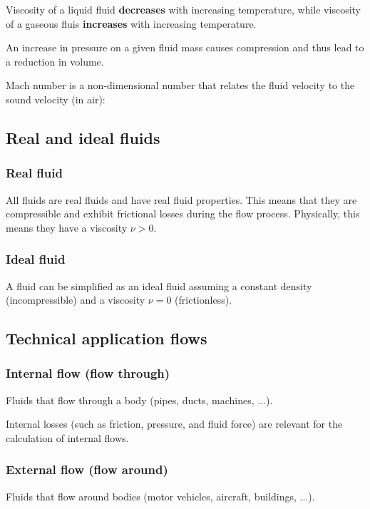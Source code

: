 \documentclass{article}
\begin{document}
Viscosity of a liquid fluid \textbf{decreases} with increasing temperature,
while viscosity of a gaseous fluis \textbf{increases} with increasing temperature.


An increase in pressure on a given fluid mass causes compression and thus
lead to a reduction in volume.

Mach number is a non-dimensional number that relates the fluid velocity
to the sound velocity (in air):


\subsection{Real and ideal fluids}
\subsubsection{Real fluid}
All fluids are real fluids and have real fluid properties. This means
that they are compressible and exhibit frictional losses during the flow process.
Physically, this means they have a viscosity $\nu > 0$.

\subsubsection{Ideal fluid}
A fluid can be simplified as an ideal fluid assuming a constant density
(incompressible) and a viscosity $\nu = 0$ (frictionless).

\newpage
\subsection{Technical application flows}
\subsubsection{Internal flow (flow through)}
Fluids that flow through a body (pipes, ducts, machines, ...).

Internal losses (such as friction, pressure, and fluid force) are relevant for the calculation of internal flows.

\subsubsection{External flow (flow around)}
Fluids that flow around bodies (motor vehicles, aircraft, buildings, ...).
\end{document}
